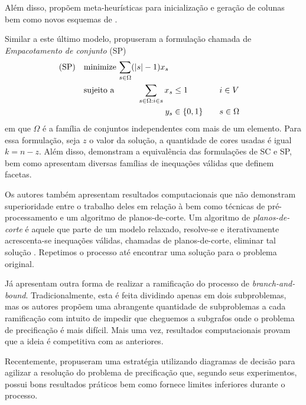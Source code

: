 \documentclass[11pt]{article}
\providecommand{\DIFaddtex}[1]{{\protect\color{blue}{#1}}} %
\providecommand{\DIFaddbegin}{} %
\providecommand{\DIFaddend}{} %
\providecommand{\DIFadd}[1]{\texorpdfstring{\DIFaddtex{#1}}{#1}} %
\newcommand{\DIFaddincludegraphics}[2][]{{\color{blue}\fbox{\DIFOincludegraphics[#1]{#2}}}} %
\DeclareRobustCommand{\DIFaddbegin}{\DIFOaddbegin \let\includegraphics\DIFaddincludegraphics} %
\DeclareRobustCommand{\DIFaddend}{\DIFOaddend \let\includegraphics\DIFOincludegraphics} %
\begin{document}
Além disso, \textcite{Malaguti2011ExactApproachVertex} propõem meta-heurísticas para inicialização e geração de colunas bem como novos esquemas de  \DIFaddbegin \DIFadd{ramificação}\DIFaddend .

Similar a este último modelo, \textcite{Hansen2009Setcoveringpacking} propuseram a formulação chamada de \emph{Empacotamento de conjunto} (SP)
\begin{alignat*}{4}
\mathrm{(SP)} \quad & \omit\rlap{minimize  $\displaystyle \sum_{s \in \Omega} (|s| - 1)x_s$} \\
& \mbox{sujeito a}&& \quad & \sum_{s \in \Omega: i \in s} x_{s}&\leq 1 & \quad & i \in V \\
&                 &&   & y_s       & \in \{0,1\} &    & s \in \Omega
\end{alignat*}
em que \(\Omega\) é a família de conjuntos independentes com mais de um elemento.
Para essa formulação, seja \(z\) o valor da solução, a quantidade de cores usadas é igual \(k = n - z\).
Além disso, \textcite{Hansen2009Setcoveringpacking} demonstram a equivalência das formulações de SC e SP, bem como apresentam diversas famílias de inequações válidas que definem facetas.

Os autores também apresentam resultados computacionais que não demonstram superioridade entre o trabalho deles em relação à \textcite{Mehrotra1996ColumnGenerationApproach} bem como técnicas de pré-processamento e um algoritmo de planos-de-corte.
Um algoritmo de \emph{planos-de-corte} é aquele que parte de um modelo relaxado, resolve-se e iterativamente acrescenta-se inequações válidas, chamadas de planos-de-corte,  \DIFaddbegin \DIFadd{para }\DIFaddend eliminar tal solução \DIFaddbegin\DIFadd{fracionária}\DIFaddend.
Repetimos o processo até encontrar uma solução para o problema original.

Já \textcite{Morrison2014WideBranchingStrategy} apresentam outra forma de realizar a ramificação do processo de \emph{branch-and-bound}.
Tradicionalmente, esta é feita dividindo apenas em dois subproblemas, mas os autores propõem uma abrangente quantidade de subproblemas a cada ramificação com intuito de impedir que cheguemos a subgrafos onde o problema de precificação é mais difícil.
Mais uma vez, resultados computacionais provam que a ideia é competitiva com as anteriores.

Recentemente, \textcite{Morrison2016SolvingPricingProblem} propuseram uma estratégia utilizando diagramas de decisão para agilizar a resolução do problema de precificação que, segundo seus experimentos, possui bons resultados práticos bem como fornece limites inferiores durante o processo.
\end{document}
